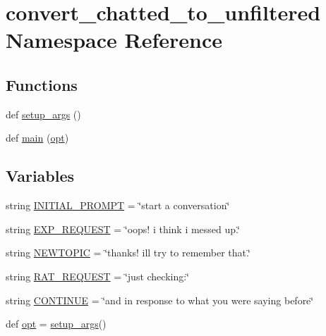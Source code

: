 \hypertarget{namespaceconvert__chatted__to__unfiltered}{}\section{convert\+\_\+chatted\+\_\+to\+\_\+unfiltered Namespace Reference}
\label{namespaceconvert__chatted__to__unfiltered}
\subsection*{Functions}
\begin{DoxyCompactItemize}
\item 
def \hyperlink{namespaceconvert__chatted__to__unfiltered_a693c3e8f97d34c4fe03e7694099fe41e}{setup\+\_\+args} ()
\item 
def \hyperlink{namespaceconvert__chatted__to__unfiltered_a0c087ccff61069c2691de5f9d7d45266}{main} (\hyperlink{namespaceconvert__chatted__to__unfiltered_a13619a4bb81dee363e89567201ca9edd}{opt})
\end{DoxyCompactItemize}
\subsection*{Variables}
\begin{DoxyCompactItemize}
\item 
string \hyperlink{namespaceconvert__chatted__to__unfiltered_ae7d96b4a4880f2813e42dc58033801d2}{I\+N\+I\+T\+I\+A\+L\+\_\+\+P\+R\+O\+M\+PT} = \char`\"{}start a conversation\char`\"{}
\item 
string \hyperlink{namespaceconvert__chatted__to__unfiltered_ae62cf39025a79721b6a97213b0eb75a3}{E\+X\+P\+\_\+\+R\+E\+Q\+U\+E\+ST} = \char`\"{}oops! i think i messed up.\char`\"{}
\item 
string \hyperlink{namespaceconvert__chatted__to__unfiltered_aa61b01471f45776f90bfdbd472c7767e}{N\+E\+W\+T\+O\+P\+IC} = \char`\"{}thanks! i\textquotesingle{}ll try to remember that.\char`\"{}
\item 
string \hyperlink{namespaceconvert__chatted__to__unfiltered_a4b47f379586283d2c2f8ef5ea4411400}{R\+A\+T\+\_\+\+R\+E\+Q\+U\+E\+ST} = \char`\"{}just checking\+:\char`\"{}
\item 
string \hyperlink{namespaceconvert__chatted__to__unfiltered_a04d4cfd69a3aa56ea10af39fb4bdcaaf}{C\+O\+N\+T\+I\+N\+UE} = \char`\"{}and in response to what you were saying before\char`\"{}
\item 
def \hyperlink{namespaceconvert__chatted__to__unfiltered_a13619a4bb81dee363e89567201ca9edd}{opt} = \hyperlink{namespaceconvert__chatted__to__unfiltered_a693c3e8f97d34c4fe03e7694099fe41e}{setup\+\_\+args}()
\end{DoxyCompactItemize}


